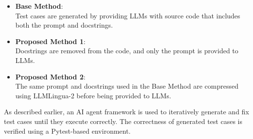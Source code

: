 \begin{itemize}[label={$\bullet$}]
    \item \textbf{Base Method}: \\Test cases are generated by providing LLMs with source code that includes both the prompt and docstrings.
\vspace{0.2cm}
    \item \textbf{Proposed Method 1}: \\Docstrings are removed from the code, and only the prompt is provided to LLMs.
\vspace{0.2cm}
    \item \textbf{Proposed Method 2}: \\The same prompt and docstrings used in the Base Method are compressed using LLMLingua-2 before being provided to LLMs.
\end{itemize}

As described earlier, an AI agent framework is used to iteratively generate and fix test cases until they execute correctly. The correctness of generated test cases is verified using a Pytest-based environment.
